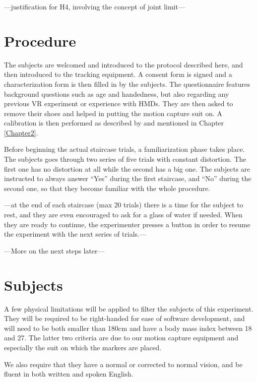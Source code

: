---justification for H4, involving the concept of joint limit---

\section{Procedure}

The subjects are welcomed and introduced to the protocol described here, and then introduced to the tracking equipment. A consent form is signed and a characterization form is then filled in by the subjects. The questionnaire features background questions such as age and handedness, but also regarding any previous VR experiment or experience with HMDs. They are then asked to remove their shoes and helped in putting the motion capture suit on. A calibration is then performed as described by \cite{molla2017egocentric} and mentioned in Chapter \ref{Chapter2}.

Before beginning the actual staircase trials, a familiarization phase takes place. The subjects goes through two series of five trials with constant distortion. The first one has no distortion at all while the second has a big one. The subjects are instructed to always answer ``Yes'' during the first staircase, and ``No'' during the second one, so that they become familiar with the whole procedure.

---at the end of each staircase (max 20 trials) there is a time for the subject to rest, and they are even encouraged to ask for a glass of water if needed. When they are ready to continue, the experimenter presses a button in order to resume the experiment with the next series of trials.---

---More on the next steps later---

\section{Subjects}

A few physical limitations will be applied to filter the subjects of this experiment. They will be required to be right-handed for ease of software development, and will need to be both smaller than 180cm and have a body mass index between 18 and 27. The latter two criteria are due to our motion capture equipment and especially the suit on which the markers are placed.

We also require that they have a normal or corrected to normal vision, and be fluent in both written and spoken English.

